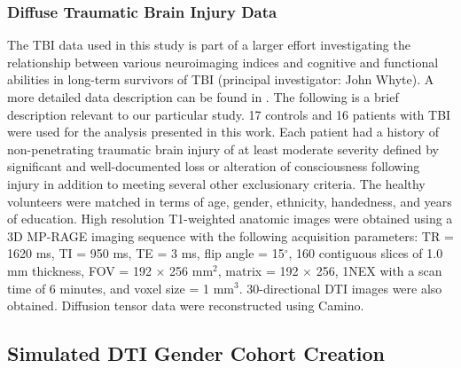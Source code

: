 \documentclass[final,5p,times,twocolumn]{elsarticle}
\begin{document}
\subsubsection{Diffuse Traumatic Brain Injury Data}

The TBI data used in this study is part of a larger effort investigating the relationship between various neuroimaging indices and cognitive and functional abilities in long-term survivors of TBI (principal investigator: John Whyte). A more detailed data description can be found in \cite{Avants2008}. The following is a brief description relevant to our particular study.  
17 controls and 16 patients with TBI were used for the analysis presented in this work.  Each patient had a history of non-penetrating traumatic brain injury 
of at least moderate severity defined by significant and well-documented
loss or alteration of consciousness following injury in addition to meeting
several other exclusionary criteria.  The healthy volunteers were matched in terms of age, gender, ethnicity, handedness, and years of education.
High resolution T1-weighted anatomic images were obtained using a 3D MP-RAGE 
imaging sequence with the following acquisition parameters: TR = 1620 ms, 
TI = 950 ms, TE = 3 ms, flip angle = 15$^\circ$, 160 contiguous slices of 
1.0 mm thickness, FOV = 192 $\times$ 256 mm$^2$, matrix = 192 $\times$ 256, 
1NEX with a scan time of 6 minutes, and voxel size = 1 mm$^3$.  30-directional
DTI images were also obtained. Diffusion tensor data were reconstructed using Camino.

\subsection{Simulated DTI Gender Cohort Creation}
\end{document}
